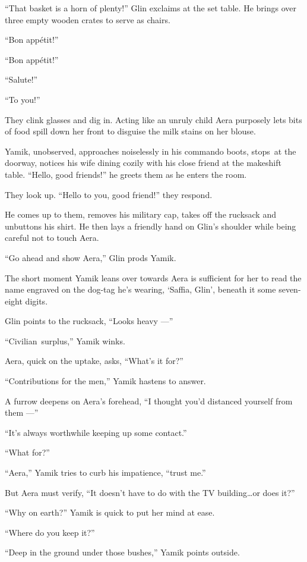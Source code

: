 \documentclass[twoside,11pt]{book}
\begin{document}
``That basket is a horn of plenty!'' Glin exclaims at the set table. He brings over three
empty wooden crates to serve as chairs.

``Bon app\'etit!''

``Bon app\'etit!''

``Salute!''

``To you!''

They clink glasses and dig in. Acting like an unruly child Aera purposely lets bits of food spill down her front to
disguise the milk stains on her blouse.

Yamik, unobserved, approaches noiselessly in his commando boots, stops~at the doorway, notices his wife dining cozily
with his close friend at the makeshift table. ``Hello, good friends!'' he greets them as he
enters the room.

They look up. ``Hello to you,{ }good{ }friend!'' they respond.

He comes up to them, removes{ }his military cap, takes off the rucksack and
unbuttons his shirt. He then lays a friendly hand on Glin's shoulder while being careful not to touch Aera.

``Go ahead and show Aera,'' Glin prods Yamik.

The short moment Yamik leans over towards Aera is sufficient for her to read the name engraved on the
dog-tag he's wearing, `Saffia, Glin', beneath it some seven-eight digits.

Glin points to the rucksack, ``Looks heavy ---''

``Civilian~surplus,'' Yamik winks.

Aera, quick on the uptake, asks, ``What's it for?''

``Contributions for the men,'' Yamik hastens to answer.

A furrow deepens on Aera's forehead, ``I thought you'd distanced yourself from them ---''

``It's always worthwhile keeping up some contact.''

``What for?''

``Aera,'' Yamik tries to curb his impatience, ``trust me.''

But Aera must verify, ``It doesn't have to do with
the TV building{\ldots}or does it?''

``Why on earth?'' Yamik is quick to put her mind at ease.

``Where do you keep it?''

``Deep in  the ground under those bushes,'' Yamik points outside.
\end{document}
